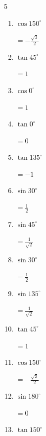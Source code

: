 \begin{multicols}{5}
\begin{enumerate}
        $\displaystyle なし$

  \item $\displaystyle \cos{150^\circ}$

        $\displaystyle =-\frac{\sqrt{3}}{2}$

  \item $\displaystyle \tan{45^\circ}$

        $\displaystyle =1$

  \item $\displaystyle \cos{0^\circ}$

        $\displaystyle =1$

  \item $\displaystyle \tan{0^\circ}$

        $\displaystyle =0$

  \item $\displaystyle \tan{135^\circ}$

        $\displaystyle =-1$

  \item $\displaystyle \sin{30^\circ}$

        $\displaystyle =\frac{1}{2}$

  \item $\displaystyle \sin{45^\circ}$

        $\displaystyle =\frac{1}{\sqrt{2}}$

  \item $\displaystyle \sin{30^\circ}$

        $\displaystyle =\frac{1}{2}$

  \item $\displaystyle \sin{135^\circ}$

        $\displaystyle =\frac{1}{\sqrt{2}}$

  \item $\displaystyle \tan{45^\circ}$

        $\displaystyle =1$

  \item $\displaystyle \cos{150^\circ}$

        $\displaystyle =-\frac{\sqrt{3}}{2}$

\columnbreak %

  \item $\displaystyle \sin{180^\circ}$

        $\displaystyle =0$

  \item $\displaystyle \tan{150^\circ}$


\end{enumerate}
\end{multicols}
